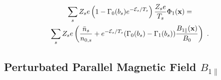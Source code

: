 \begin{gather}
	\sum_s Z_se \left(1 - \Gamma_0(b_s)e^{-\mathcal{E}_s/T_s}\right) \frac{Z_se}{T_s} \Phi_1(\boldsymbol{\mathbf{x}}) = \\
	\sum_s Z_se \left(\frac{\bar{n}_s}{n_{0,s}}+ e^{-\mathcal{E}_s/T_s} (\Gamma_0(b_s) - \Gamma_1(b_s))\frac{B_{1\parallel}(\boldsymbol{\mathbf{x}})}{B_0} \right)~.
	\label{eq:fieldPotential}
\end{gather}

\newpage

\subsection{Perturbated Parallel Magnetic Field $B_{1\parallel}$}
\label{sub:fieldMagnetic}

